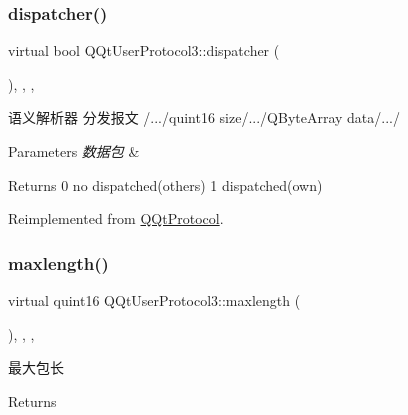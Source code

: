 \subsubsection{\texorpdfstring{dispatcher()}{dispatcher()}}
{\footnotesize\ttfamily virtual bool Q\+Qt\+User\+Protocol3\+::dispatcher (\begin{DoxyParamCaption}\item[{const Q\+Byte\+Array \&}]{ }\end{DoxyParamCaption})\hspace{0.3cm}{\ttfamily [inline]}, {\ttfamily [override]}, {\ttfamily [protected]}, {\ttfamily [virtual]}}



语义解析器 分发报文 /.../quint16 size/.../\+Q\+Byte\+Array data/.../ 


\begin{DoxyParams}{Parameters}
{\em 数据包} & \\
\hline
\end{DoxyParams}
\begin{DoxyReturn}{Returns}
0 no dispatched(others) 1 dispatched(own) 
\end{DoxyReturn}


Reimplemented from \mbox{\hyperlink{class_q_qt_protocol_a35a69c4b89c8cf7459038f40d75e0dc9}{Q\+Qt\+Protocol}}.

\mbox{\label{class_q_qt_user_protocol3_ac23445025360c20fb0e67809a1a092c7}} 
\subsubsection{\texorpdfstring{maxlength()}{maxlength()}}
{\footnotesize\ttfamily virtual quint16 Q\+Qt\+User\+Protocol3\+::maxlength (\begin{DoxyParamCaption}{ }\end{DoxyParamCaption})\hspace{0.3cm}{\ttfamily [inline]}, {\ttfamily [override]}, {\ttfamily [protected]}, {\ttfamily [virtual]}}



最大包长 

\begin{DoxyReturn}{Returns}

\end{DoxyReturn}


